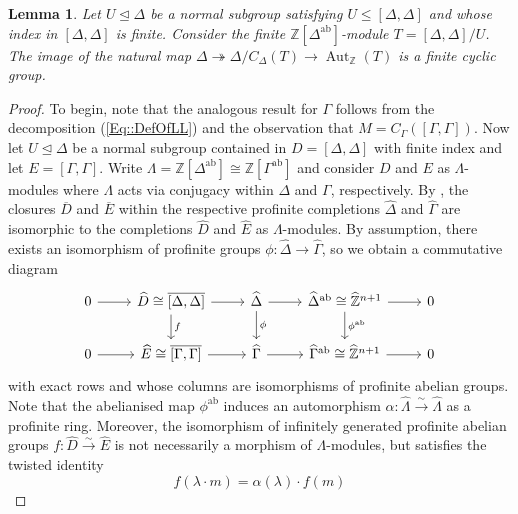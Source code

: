 \documentclass{amsart}
\numberwithin{theorem}{section}
\numberwithin{equation}{section}
\newtheorem{lemma}[theorem]{Lemma}
\newcommand{\Z}{\mathbb{Z}}
\newcommand{\hD}{\widehat{\Delta}}
\newcommand{\hG}{\widehat{\Gamma}}
\begin{document}
\begin{lemma} \label{cyclic} Let $U \trianglelefteq \Delta$ be a normal subgroup satisfying $U \leq [\Delta, \Delta]$ and whose index in $[\Delta, \Delta ]$ is finite. Consider the finite $\mathbb Z[\Delta^\mathrm{ab}]$-module $T =[\Delta,\Delta]/U$. The image of the natural map $\Delta \twoheadrightarrow \Delta / C_\Delta(T) \to \operatorname{Aut}_\mathbb Z(T)$ is a finite cyclic group.
\end{lemma}
\begin{proof}
    To begin, note that the analogous result for $\Gamma$ follows from the decomposition (\ref{Eq::DefOfLL}) and the observation that $M = C_\Gamma([\Gamma,\Gamma])$. Now let $U \trianglelefteq \Delta$ be a normal subgroup contained in $D = [\Delta, \Delta]$ with finite index and let $E = [\Gamma,\Gamma]$. Write $\Lambda = \Z[\Delta^\mathrm{ab}] \cong \Z[\Gamma^\mathrm{ab}]$ and consider $D$ and $E$ as $\Lambda$-modules where $\Lambda$ acts via conjugacy within $\Delta$ and $\Gamma$, respectively. By \cite[Lemma 5.2]{Wykowski2025_2}, the closures $\overline{D}$ and $\overline{E}$ within the respective profinite completions $\hD$ and $\hG$ are isomorphic to the completions $\widehat{D}$ and $\widehat{E}$ as $\Lambda$-modules. By assumption, there exists an isomorphism of profinite groups $\phi \colon \hD \to \hG$, so we obtain a commutative diagram
    \[
    \begin{tikzcd}
0 \arrow[r] & {\widehat{D} \cong \overline{[\Delta, \Delta]}} \arrow[r] \arrow[d, "f"] & \hD \arrow[r] \arrow[d, "\phi"] & \hD^\mathrm{ab} \cong \widehat{\Z}^{n+1} \arrow[r] \arrow[d, "\phi^\mathrm{ab}"] & 0 \\
0 \arrow[r] & {\widehat{E} \cong \overline{[\Gamma, \Gamma]}} \arrow[r]                & \hG \arrow[r]                   & \hG^\mathrm{ab} \cong \widehat{\Z}^{n+1} \arrow[r]                               & 0
\end{tikzcd}
    \]
with exact rows and whose columns are isomorphisms of profinite abelian groups. Note that the abelianised map $\phi^\mathrm{ab}$ induces an automorphism $\alpha \colon \widehat{\Lambda} \xrightarrow{\sim}\widehat{\Lambda}$ as a profinite ring. Moreover, the isomorphism of infinitely generated profinite abelian groups $f \colon \widehat{D} \xrightarrow{\sim} \widehat{E}$ is not necessarily a morphism of $\Lambda$-modules, but satisfies the twisted identity
\begin{equation}
    f(\lambda \cdot m) = \alpha(\lambda) \cdot f(m) 
\end{equation}

\end{proof}
\end{document}
